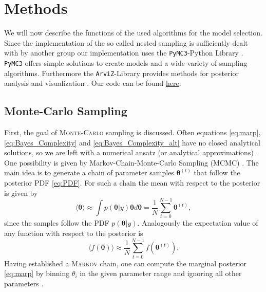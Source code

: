 \documentclass[%
 reprint,
 amsmath,amssymb,
 aps,
]{revtex4-1}
\begin{document}
\section{Methods}\label{sec:meth}
\noindent We will now describe the functions of the used algorithms for the model selection. Since the implementation of the so called nested sampling is sufficiently dealt with by another group \cite{paramter_fit} our implementation uses the \texttt{PyMC3}-Python Library \cite{PyMC3}.  \texttt{PyMC3} offers simple solutions to create models and a wide variety of sampling algorithms. Furthermore the \texttt{ArviZ}-Library provides methods for posterior analysis and visualization \cite{ArviZ}. Our code can be found \hyperref{https://github.com/dschuechter/physics760_schuechter_krause}{Github-Repository}{Bayes model selection}{here}.

 \subsection{Monte-Carlo Sampling}
\noindent First, the goal of \textsc{Monte-Carlo} sampling is discussed. Often equations \eqref{eq:marp}, \eqref{eq:Bayes_Complexity} and \eqref{eq:Bayes_Complexity_alt} have no closed analytical solutions, so we are left with a numerical ansatz (or analytical approximations) \cite{Toussaint}. One possibility is given by Markov-Chain-Monte-Carlo Sampling (MCMC) \cite{Toussaint}. The main idea is to generate a chain of parameter samples $\boldsymbol{\theta}^{(t)}$ that follow the posterior PDF \eqref{eq:PDF}. For such a chain the mean with respect to the posterior is given by 
 \begin{equation}
 	\langle \boldsymbol{\theta}\rangle\approx \int p(\boldsymbol{\theta} | y)\boldsymbol{\theta}d\boldsymbol{\theta}=\frac{1}{N}\sum_{t=0}^{N-1}\boldsymbol{\theta}^{(t)},
 \end{equation}
since the samples follow the PDF $p(\boldsymbol{\theta} | y)$. Analogously the expectation value of any function with respect to the posterior is
 \begin{equation}
	\langle f(\boldsymbol{\theta})\rangle\approx\frac{1}{N}\sum_{t=0}^{N-1}f(\boldsymbol{\theta}^{(t)}).
\end{equation}
Having established a \textsc{Markov} chain, one can compute the marginal posterior \eqref{eq:marp} by binning $\theta_i$ in the given parameter range and ignoring all other parameters \cite{Trotta_2008}. 
\end{document}
